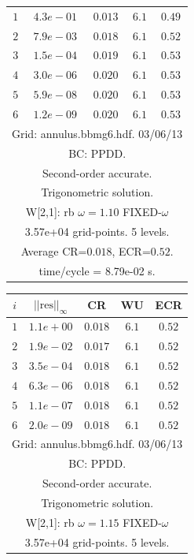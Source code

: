 \begin{table}[hbt]
\begin{center}
{\begin{tabular}{|c|c|c|c|c|}
 $ 1$  & $ 4.3e-01$ & $0.013$ & $ 6.1$ & $0.49$ \\ 
 $ 2$  & $ 7.9e-03$ & $0.018$ & $ 6.1$ & $0.52$ \\ 
 $ 3$  & $ 1.5e-04$ & $0.019$ & $ 6.1$ & $0.53$ \\ 
 $ 4$  & $ 3.0e-06$ & $0.020$ & $ 6.1$ & $0.53$ \\ 
 $ 5$  & $ 5.9e-08$ & $0.020$ & $ 6.1$ & $0.53$ \\ 
 $ 6$  & $ 1.2e-09$ & $0.020$ & $ 6.1$ & $0.53$ \\ 
\hline 
\multicolumn{5}{|c|}{Grid: annulus.bbmg6.hdf. 03/06/13}  \\
\multicolumn{5}{|c|}{BC: PPDD.}  \\
\multicolumn{5}{|c|}{Second-order accurate.}  \\
\multicolumn{5}{|c|}{Trigonometric solution.}  \\
\multicolumn{5}{|c|}{W[2,1]: rb $\omega=1.10$ FIXED-$\omega$}  \\
\multicolumn{5}{|c|}{3.57e+04 grid-points. 5 levels.}  \\
\multicolumn{5}{|c|}{Average CR=$0.018$, ECR=$0.52$.}  \\
\multicolumn{5}{|c|}{time/cycle = 8.79e-02 s.}  \\
\hline 
\end{tabular}
\begin{tabular}{|c|c|c|c|c|} \hline 
 $i$   & $\vert\vert\mbox{res}\vert\vert_\infty$  &  CR     &  WU    & ECR  \\   \hline 
 $ 1$  & $ 1.1e+00$ & $0.018$ & $ 6.1$ & $0.52$ \\ 
 $ 2$  & $ 1.9e-02$ & $0.017$ & $ 6.1$ & $0.52$ \\ 
 $ 3$  & $ 3.5e-04$ & $0.018$ & $ 6.1$ & $0.52$ \\ 
 $ 4$  & $ 6.3e-06$ & $0.018$ & $ 6.1$ & $0.52$ \\ 
 $ 5$  & $ 1.1e-07$ & $0.018$ & $ 6.1$ & $0.52$ \\ 
 $ 6$  & $ 2.0e-09$ & $0.018$ & $ 6.1$ & $0.52$ \\ 
\hline 
\multicolumn{5}{|c|}{Grid: annulus.bbmg6.hdf. 03/06/13}  \\
\multicolumn{5}{|c|}{BC: PPDD.}  \\
\multicolumn{5}{|c|}{Second-order accurate.}  \\
\multicolumn{5}{|c|}{Trigonometric solution.}  \\
\multicolumn{5}{|c|}{W[2,1]: rb $\omega=1.15$ FIXED-$\omega$}  \\
\multicolumn{5}{|c|}{3.57e+04 grid-points. 5 levels.}  \\

\end{tabular}}
\end{center}
\end{table}
